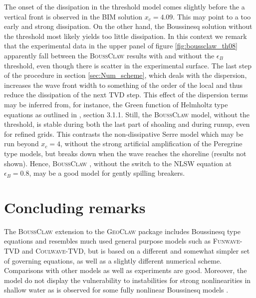 \documentclass[review]{elsarticle}
\newcommand{\BoussClaw}{\textsc{BoussClaw} }
\begin{document}
The onset of the dissipation in the threshold model comes slightly before the a vertical front is observed in the BIM solution $x_c=4.09$. This may point to a too early and strong dissipation. On the other hand, the Boussinesq solution without the threshold most likely
yields too little dissipation. In this context we remark that the experimental data in
the upper panel of figure \ref{fig:boussclaw_th08} apparently fall between the \BoussClaw results with and 
without the $\epsilon_B$ threshold, even though there is scatter in the experimental 
surface. 
The last step of the procedure in section \ref{sec:Num_scheme}, which
deals with the dispersion, increases the wave front width to something of the order of
the local and thus reduce the dissipation 
of the next TVD step. This effect of the dispersion terms may be inferred from, for instance, the Green function of Helmholtz type equations as outlined in \cite{Glimsdal:2004}, section 3.1.1. Still, the \BoussClaw model, without the threshold, is stable during 
both the last part of shoaling and during runup, even for refined grids. This contrasts
the non-dissipative Serre model which may be run beyond $x_c=4$, without the strong artificial amplification of the Peregrine type models, but breaks down when the wave reaches the shoreline (results not shown). Hence, \BoussClaw, without the switch to the NLSW equation at
$\epsilon_B=0.8$, may be a good model for gently spilling breakers.



\section{Concluding remarks}
\label{sec:conclusion}
The \BoussClaw extension to the \textsc{GeoClaw} package includes Boussinesq type equations
and resembles much used general purpose models such as \textsc{Funwave-TVD} and
\textsc{Coulwave-TVD}, but is based on a different and somewhat  simpler 
set of governing equations, as well as a slightly different numerical scheme. 
Comparisons with other models as well as experiments are good. Moreover,
the model do not display the vulnerability to instabilities for 
strong nonlinearities in shallow water
as is observed for some fully nonlinear Boussinesq models \citep{Lovholt:2013}. 
\end{document}
